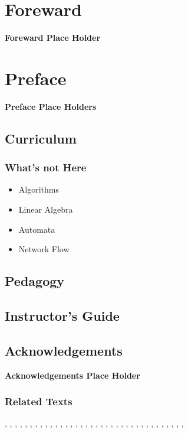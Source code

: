 \chapter*{Foreward}

\textbf{Foreward Place Holder}

\chapter*{Preface}

\textbf{Preface Place Holders}

\cite{Lehman201x}

\section*{Curriculum}

\subsection*{What's not Here}
\begin{itemize}
\item Algorithms
\item Linear Algebra
\item Automata
\item Network Flow
\end{itemize}

\section*{Pedagogy}

\section*{Instructor's Guide}

\section*{Acknowledgements}

\textbf{Acknowledgements Place Holder}

\subsection*{Related Texts}

\cite{AignerG99},
\cite{Apostol67},
\cite{BachS96},
\cite{Bender05},
\cite{BenjaminQ03},
\cite{Biggs02},
\cite{Bollobas98},
\cite{Bona07},
\cite{Boolos74},
\cite{CormenLRS2009},
\cite{Cupillari12},
\cite{Diestel00},
\cite{Even73},
\cite{Fellerv168},
\cite{Flajolet09},
\cite{Gersting03},
\cite{GoodaireP01},
\cite{GrahamKP94}, 
\cite{GrinsteadS97},
\cite{Gusfield89},
\cite{HaggardSW05},
\cite{HartsfieldR03},
\cite{LawlerC1999},
\cite{LovaszPV03},
\cite{Machtey78},
\cite{Matiyasevich93},
\cite{Mitzenmacher05},
\cite{MotwaniR95},
\cite{Polya57},
\cite{Rosen02},
\cite{Ross02},
\cite{Schneierman12},
\cite{Shoup05},
\cite{Strang86},
\cite{Velleman94},
\cite{Wilf90},
\cite{Williams01}

